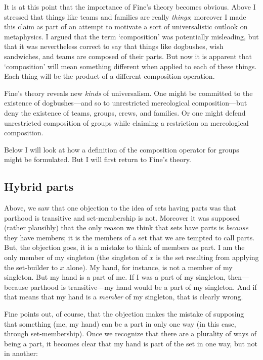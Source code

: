 \documentclass[11pt]{article}
\begin{document}
\begin{spacing}{1.5}
It is at this point that the importance of Fine's theory becomes
obvious.  Above I stressed that things like teams and families are
really {\em things}; moreover I made this claim as part of an attempt
to motivate a sort of universalistic outlook on metaphysics.  I argued
that the term `composition' was potentially misleading, but that it
was nevertheless correct to say that things like dogbushes, wish
sandwiches, and teams are composed of their parts.  But now it is
apparent that `composition' will mean something different when applied
to each of these things.  Each thing will be the product of a
different composition operation.

Fine's theory reveals new {\em kinds} of universalism.  One might be
committed to the existence of dogbushes---and so to unrestricted
mereological composition---but deny the existence of teams, groups,
crews, and families.  Or one might defend unrestricted composition of
groups while claiming a restriction on mereological composition.

Below I will look at how a definition of the composition operator for
groups might be formulated.  But I will first return to Fine's theory.

\subsection{Hybrid parts}
\label{hybrid}
Above, we saw that one objection to the idea of sets having parts was
that parthood is transitive and set-membership is not.  Moreover it
was supposed (rather plausibly) that the only reason we think that
sets have parts is {\em because} they have members; it is the members
of a set that we are tempted to call parts.  But, the objection goes,
it is a mistake to think of members as part.  I am the only member of
my singleton (the singleton of $x$ is the set resulting from applying
the set-builder to $x$ alone).  My hand, for instance, is not a member
of my singleton.  But my hand is a part of me.  If I was a part of my
singleton, then---because parthood is transitive---my hand would be a
part of my singleton.  And if that means that my hand is a {\em
  member} of my singleton, that is clearly wrong.

Fine points out, of course, that the objection makes the mistake of
supposing that something (me, my hand) can be a part in only one way
(in this case, through set-membership).  Once we recognize that there
are a plurality of ways of being a part, it becomes clear that my hand
is part of the set in one way, but not in another:


\end{spacing}
\end{document}
